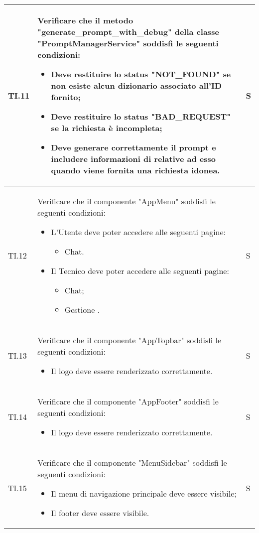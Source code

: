 \begin{adjustwidth}{-0.5cm}{-0.5cm}
\begin{longtable}{|P{1.5cm}|>{\raggedright}P{9.5cm}|>{\arraybackslash}P{1.5cm}|}
		\hline TI.11 & Verificare che il metodo "generate\_prompt\_with\_debug" della classe "PromptManagerService" soddisfi le seguenti condizioni:
		\begin{itemize}
			\item Deve restituire lo status "NOT\_FOUND" se non esiste alcun dizionario associato all'ID fornito;
			\item Deve restituire lo status "BAD\_REQUEST" se la richiesta è incompleta;
			\item Deve generare correttamente il prompt e includere informazioni di  relative ad esso quando viene fornita una richiesta idonea.
		\end{itemize} & S \\

    \hline TI.12 & Verificare che il componente "AppMenu" soddisfi le seguenti condizioni:
    \begin{itemize}
      \item L'Utente deve poter accedere alle seguenti pagine:
      \begin{itemize}
        \item Chat.
      \end{itemize}
      \item Il Tecnico deve poter accedere alle seguenti pagine:
      \begin{itemize}
        \item Chat;
        \item Gestione .
      \end{itemize}
    \end{itemize} & S \\

    \hline TI.13 & Verificare che il componente "AppTopbar" soddisfi le seguenti condizioni:
    \begin{itemize}
      \item Il logo deve essere renderizzato correttamente.
    \end{itemize} & S \\

    \hline TI.14 & Verificare che il componente "AppFooter" soddisfi le seguenti condizioni:
    \begin{itemize}
      \item Il logo deve essere renderizzato correttamente.
    \end{itemize} & S \\

    \hline TI.15 & Verificare che il componente "MenuSidebar" soddisfi le seguenti condizioni:
    \begin{itemize}
      \item Il menu di navigazione principale deve essere visibile;
      \item Il footer deve essere visibile.
    \end{itemize} & S \\


\end{longtable}
\end{adjustwidth}
